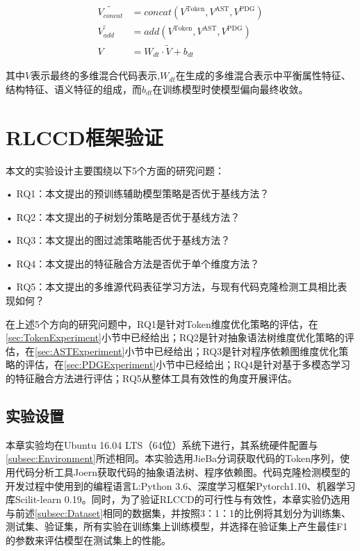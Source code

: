 \begin{equation}\label{e6.1}
  \begin{split}
    \tilde{V_{concat}} &= concat \left( V^{\text{Token}} , V^{\text{AST}} , V^{\text{PDG}}\right) \\
    \tilde{V_{add}} &= add \left( V^{\text{Token}} , V^{\text{AST}} , V^{\text{PDG}}\right) \\
    V &= W_{dt} \cdot \tilde{V} + b_{dt}
  \end{split}
\end{equation}

其中$V$表示最终的多维混合代码表示,$W_{dt}$在生成的多维混合表示中平衡属性特征、结构特征、语义特征的组成，而$b_{dt}$在训练模型时使模型偏向最终收敛。

\section{RLCCD框架验证}
本文的实验设计主要围绕以下5个方面的研究问题：

• RQ1：本文提出的预训练辅助模型策略是否优于基线方法？

• RQ2：本文提出的子树划分策略是否优于基线方法？

• RQ3：本文提出的图过滤策略能否优于基线方法？

• RQ4：本文提出的特征融合方法是否优于单个维度方法？

• RQ5：本文提出的多维源代码表征学习方法，与现有代码克隆检测工具相比表现如何？

在上述5个方向的研究问题中，RQ1是针对Token维度优化策略的评估，在\ref{sec:TokenExperiment}小节中已经给出；RQ2是针对抽象语法树维度优化策略的评估，在\ref{sec:ASTExperiment}小节中已经给出；RQ3是针对程序依赖图维度优化策略的评估，在\ref{sec:PDGExperiment}小节中已经给出；RQ4是针对基于多模态学习的特征融合方法进行评估；RQ5从整体工具有效性的角度开展评估。

\subsection{实验设置}

本章实验均在Ubuntu 16.04 LTS（64位）系统下进行，其系统硬件配置与\ref{subsec:Environment}所述相同。本实验选用JieBa分词获取代码的Token序列，使用代码分析工具Joern获取代码的抽象语法树、程序依赖图。代码克隆检测模型的开发过程中使用到的编程语言L:Python 3.6、深度学习框架Pytorch1.10、机器学习库Scilit-learn 0.19。同时，为了验证RLCCD的可行性与有效性，本章实验仍选用与前述\ref{subsec:Dataset}相同的数据集，并按照3：1：1的比例将其划分为训练集、测试集、验证集，所有实验在训练集上训练模型，并选择在验证集上产生最佳F1的参数来评估模型在测试集上的性能。

